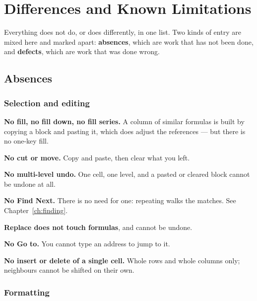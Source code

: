 \chapter{Differences and Known Limitations}
\label{app:differences}

Everything \ccprod{} does not do, or does differently, in one list. Two kinds of
entry are mixed here and marked apart: \textbf{absences}, which are work that
has not been done, and \textbf{defects}, which are work that was done wrong.

\section{Absences}

\subsection{Selection and editing}

\begin{ccsteps}
\item \textbf{No fill, no fill down, no fill series.} A column of similar
formulas is built by copying a block and pasting it, which does adjust the
references --- but there is no one-key fill.
\item \textbf{No cut or move.} Copy and paste, then clear what you left.
\item \textbf{No multi-level undo.} One cell, one level, and a pasted or
cleared block cannot be undone at all.
\item \textbf{No Find Next.} There is no need for one: repeating
 walks the matches. See Chapter~\ref{ch:finding}.
\item \textbf{Replace does not touch formulas}, and cannot be undone.
\item \textbf{No Go to.} You cannot type an address to jump to it.
\item \textbf{No insert or delete of a single cell.} Whole rows and whole
columns only; neighbours cannot be shifted on their own.
\end{ccsteps}

\subsection{Formatting}

